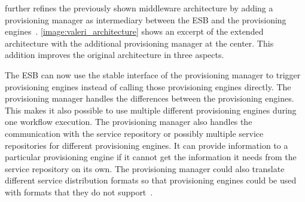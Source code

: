 \citeauthor*{provisioning:dynamic} further refines the previously shown middleware architecture by adding a provisioning manager as intermediary between the ESB and the provisioning engines~\autocite{provisioning:dynamic}.
\autoref{image:valeri_architecture} shows an excerpt of the extended architecture with the additional provisioning manager at the center.
This addition improves the original architecture in three aspects.

The ESB can now use the stable interface of the provisioning manager to trigger provisioning engines instead of calling those provisioning engines directly.
The provisioning manager handles the differences between the provisioning engines.
This makes it also possible to use multiple different provisioning engines during one workflow execution.
The provisioning manager also handles the communication with the service repository or possibly multiple service repositories for different provisioning engines.
It can provide information to a particular provisioning engine if it cannot get the information it needs from the service repository on its own.
The provisioning manager could also translate different service distribution formats so that provisioning engines could be used with formats that they do not support~\autocite{provisioning:dynamic}.
